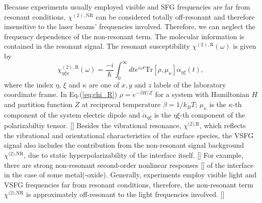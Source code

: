 Because experiments usually employed visible and SFG frequencies are far from resonant 
conditions, $\chi^{(2),\text{NR}}$ can be considered totally off-resonant and therefore 
insensitive to the laser beams' frequencies involved. Therefore, we can neglect the 
frequency dependence of the non-resonant term.
The molecular information is contained in the resonant signal. The resonant susceptibility $\chi^{(2),\text{R}}(\omega)$ is given by 
\begin{equation}
  \chi_{\eta\xi\kappa}^{(2),\text{R}}(\omega)=\frac{-i}{\hbar}\int_0^\infty dt e^{i\omega t} \text{Tr}{[\rho,\mu_\kappa]\alpha_{\eta\xi}(t)},
\label{eq:chi_R}
\end{equation}
where the index $\eta$, $\xi$ and $\kappa$ are one of $x, y$ and $z$ labels of the laboratory coordinate frame.
In Eq.\thinspace(\ref{eq:chi_R}) $\rho=e^{-\beta H/Z}$ for a system with Hamiltonian $H$ and partition function $Z$ at reciprocal temperature $\beta=1/k_BT$;
$\mu_\kappa$ is the $\kappa$-th component of the system electric dipole and ${\alpha_{\eta\xi}}$ is the $\eta\xi$-th component of the polarizabiltiy tensor. [\cite{1995SM}]
Besides the vibrational resonance, $\chi^{\text{(2),R}}$, which reflects the vibrational and orientational characteristics of the surface species, 
the VSFG signal also includes the contribution from the non-resonant signal background $\chi^{\text{(2),NR}}$, 
due to static hyperpolarizability of the interface itself. [\cite{Che12}]  
For example, there are strong non-resonant second-order nonlinear responses [\cite{Pradier11,Vanselow12,Wieckowski99}] of the interface in the case of some metal(-oxide). 
Generally, experiments employ visible light and VSFG frequencies far from resonant conditions, therefore, the non-resonant 
term $\chi^{\text{(2),NR}}$ is approximately off-resonant to the light frequencies involved. [\cite{Morita02}]

